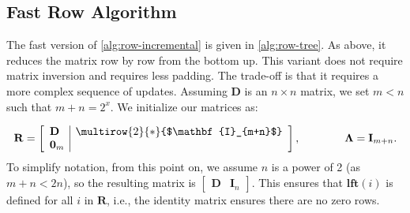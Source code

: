 \documentclass[10pt,a4paper]{article}
\newcommand{\matsize}[2]{#1\times #2}
\newcommand{\mat}[1]{\mathbf{#1}}
\newcommand{\bdr}{\mat{D}}
\newcommand{\lft}{\mathbf{lft}}
\newcommand{\Remark}[1]{\textcolor{blue}{[#1]}}
\begin{document}
\subsection{Fast Row Algorithm}
The fast version of \cref{alg:row-incremental} is given in \cref{alg:row-tree}.
As above, it reduces the matrix row by row from the bottom up. This variant does not require matrix inversion and requires less padding. The trade-off is that it requires a more complex sequence of updates. Assuming $\mat{D}$ is an $\matsize{n}{n}$ matrix,  we set $m<n$ such that $m+n = 2^x$. We  initialize our matrices as:


\[
\mat{R} = 
\left[
\begin{array}{l|c}
\bdr & \multirow{2}{*}{$\mat{I}_{m+n}$}\\
\mat{0}_m& 
\end{array}
\right], \qquad\qquad \mat{\Lambda} = \mat{I}_{m+n}. 
\]
%
%
To simplify notation, from this point on, we assume $n$ is a power of 2 (as $m+n<2n$), so the resulting matrix is $\begin{bmatrix} \mat{D}& \mat{I}_n\end{bmatrix}$. This ensures that $\lft  (i)$ is defined for all $i$ in $\mat{R}$, i.e., the identity matrix ensures there are no zero rows.  
\end{document}
